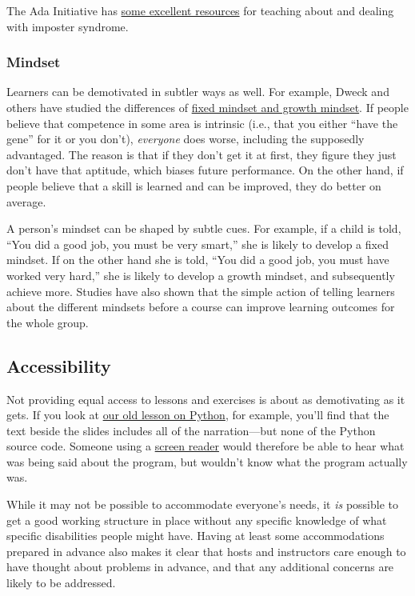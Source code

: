 The Ada Initiative has
\href{http://adainitiative.org/continue-our-work/impostor-syndrome-training/}{some excellent resources}
for teaching about and dealing with imposter syndrome.

\subsubsection*{Mindset}

Learners can be demotivated in subtler ways as well.
For example,
Dweck and others have studied the differences of
\href{https://en.wikipedia.org/wiki/Mindset\#Fixed\_mindset\_and\_growth\_mindset}{fixed mindset and growth mindset}.
If people believe that competence in some area is intrinsic
(i.e., that you either ``have the gene'' for it or you don't),
\emph{everyone} does worse, including the supposedly advantaged.
The reason is that if they don't get it at first,
they figure they just don't have that aptitude,
which biases future performance.
On the other hand,
if people believe that a skill is learned and can be improved,
they do better on average.

A person's mindset can be shaped by subtle cues.
For example,
if a child is told,
``You did a good job, you must be very smart,''
she is likely to develop a fixed mindset.
If on the other hand she is told,
``You did a good job, you must have worked very hard,''
she is likely to develop a growth mindset,
and subsequently achieve more.  Studies have also shown that
the simple action of telling learners about the different mindsets
before a course can improve learning outcomes for the whole group.

\subsection*{Accessibility}

Not providing equal access to lessons and exercises
is about as demotivating as it gets.
If you look at \href{http://swcarpentry.github.io/v4/python/flow.html}{our old lesson on Python},
for example,
you'll find that the text beside the slides includes all of the narration---but
none of the Python source code.
Someone using a \href{https://en.wikipedia.org/wiki/Screen\_reader}{screen reader}
would therefore be able to hear what was being said about the program,
but wouldn't know what the program actually was.

While it may not be possible to accommodate everyone's needs,
it \emph{is} possible to get a good working structure in place
without any specific knowledge of what specific disabilities people might have.
Having at least some accommodations prepared in advance also makes it clear that
hosts and instructors care enough to have thought about problems in advance,
and that any additional concerns are likely to be addressed.

